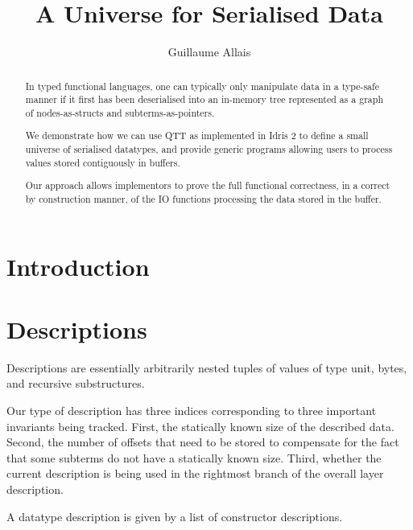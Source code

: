 \documentclass{article}
\title{A Universe for Serialised Data}
\author{Guillaume Allais}
\newcommand{\idris}{Idris 2}
\begin{document}
\maketitle

\begin{abstract}
In typed functional languages, one can typically only manipulate data
in a type-safe manner if it first has been deserialised into an in-memory
tree represented as a graph of nodes-as-structs and subterms-as-pointers.

We demonstrate how we can use QTT as implemented in \idris{} to define
a small universe of serialised datatypes, and provide generic programs
allowing users to process values stored contiguously in buffers.

Our approach allows implementors to prove the full functional correctness,
in a correct by construction manner, of the IO functions processing the
data stored in the buffer.
\end{abstract}

\section{Introduction}

\section{Descriptions}

Descriptions are essentially arbitrarily nested tuples of
values of type unit,
bytes,
and recursive substructures.

Our type of description has three indices corresponding to three important
invariants being tracked.
%
First, the statically known size of the described data.
%
Second, the number of offsets that need to be stored to compensate for the
fact that some subterms do not have a statically known size.
%
Third, whether the current description is being used in the rightmost branch
of the overall layer description.




A datatype description is given by a list of constructor descriptions.



\end{document}
